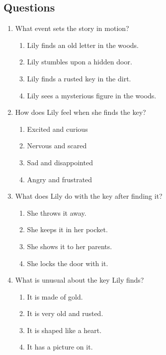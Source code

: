 \documentclass[12pt]{article}
\begin{document}
\subsection*{Questions}
\begin{enumerate}

    \item What event sets the story in motion?
    \begin{enumerate}[label=\Alph*.]
        \item Lily finds an old letter in the woods.
        \item Lily stumbles upon a hidden door.
        \item Lily finds a rusted key in the dirt.
        \item Lily sees a mysterious figure in the woods.
    \end{enumerate}

    \vspace{0.5cm}

    \item How does Lily feel when she finds the key?
    \begin{enumerate}[label=\Alph*.]
        \item Excited and curious
        \item Nervous and scared
        \item Sad and disappointed
        \item Angry and frustrated
    \end{enumerate}

    \vspace{0.5cm}

    \item What does Lily do with the key after finding it?
    \begin{enumerate}[label=\Alph*.]
        \item She throws it away.
        \item She keeps it in her pocket.
        \item She shows it to her parents.
        \item She locks the door with it.
    \end{enumerate}

    \vspace{0.5cm}

    \item What is unusual about the key Lily finds?
    \begin{enumerate}[label=\Alph*.]
        \item It is made of gold.
        \item It is very old and rusted.
        \item It is shaped like a heart.
        \item It has a picture on it.
    \end{enumerate}


\end{enumerate}
\end{document}

